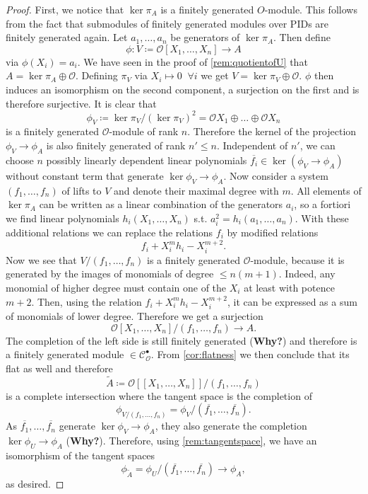 \documentclass{article}
\theoremstyle{plain}%
\theoremstyle{definition}
\theoremstyle{remark}
\newcommand{\cob}{\mathcal{C}_\mathcal{O}^\bullet}
\begin{document}
\begin{proof}
    First, we notice that \(\ker \pi_A\) is a finitely generated \(O\)-module.
    This follows from the fact that submodules of finitely generated modules over PIDs
    are finitely generated again.
    Let \(a_1, \dots, a_n\) be generators of \(\ker \pi_A\). Then define
    \[
        \phi\colon V \coloneqq \mathcal{O}[X_1, \dots, X_n] \to A  
    \]
    via \(\phi(X_i) = a_i\).
    We have seen in the proof of \cref{rem:quotientofU} that \(A = \ker \pi_A \oplus \mathcal{O}\).
    Defining \(\pi_V\) via \(X_i \mapsto 0\;\; \forall i\) we get \(V = \ker \pi_V \oplus \mathcal{O}\).
    \(\phi\) then induces an isomorphism on the second component, a surjection on the first
    and is therefore surjective.
    It is clear that
    \[
        \phi_V \coloneqq \ker \pi_V/(\ker \pi_V)^2 = \mathcal{O}X_1 \oplus \dots \oplus \mathcal{O}X_n
    \] 
    is a finitely generated \(\mathcal{O}\)-module of rank \(n\).
    Therefore the kernel of the projection \(\phi_V \to \phi_A\) is also finitely generated 
    of rank \(n' \leq n\).
    Independent of \(n'\), we can choose \(n\) possibly linearly dependent linear polynomials 
    \(\overline{f_i} \in \ker(\phi_V \to \phi_A)\) without constant term that generate 
    \(\ker \phi_V \to \phi_A\).
    Now consider a system \((f_1, \dots, f_n)\) of lifts to \(V\) and denote their maximal degree with \(m\).
    All elements of \(\ker \pi_A\) can be written as a linear combination of the generators \(a_i\), so a fortiori
    we find linear polynomials \(h_i(X_1, \dots, X_n)\) s.t. \(a_i^2 = h_i(a_1, \dots, a_n)\).
    With these additional relations we can replace the relations \(f_i\) by modified relations
    \[
        f_i + X_i^mh_i - X_i^{m+2}.  
    \]
    Now we see that \(V/(f_1, \dots, f_n)\) is a finitely generated \(\mathcal{O}\)-module, 
    because it is generated by the images of monomials of degree \(\leq n(m+1)\). Indeed, any monomial
    of higher degree must contain one of the \(X_i\) at least with potence \(m+2\). Then, using
    the relation \(f_i + X_i^mh_i - X_i^{m+2}\), it can be expressed as a sum of 
    monomials of lower degree.
    Therefore we get a surjection 
    \[
        \mathcal{O}[X_1, \dots, X_n]/(f_1, \dots, f_n) \to A.  
    \]
    The completion of the left side is still finitely generated (\textbf{Why?}) and therefore is
    a finitely generated module \(\in \cob\). From \cref{cor:flatness} we then
    conclude that its flat as well and therefore
    \[
        \tilde{A} \coloneqq \mathcal{O}[[X_1, \dots, X_n]]/(f_1, \dots, f_n)
    \]
    is a complete intersection where the tangent space is the completion of 
    \[
        \phi_{V/(f_1, \dots, f_n)} = \phi_V/(\overline{f_1}, \dots, \overline{f_n}).
    \]
    As \(\overline{f_1}, \dots, \overline{f_n}\) generate \(\ker \phi_V \to \phi_A\), they also generate 
    the completion \(\ker \phi_U \to \phi_A\) (\textbf{Why?}). Therefore, using \cref{rem:tangentspace}, 
    we have an isomorphism of the tangent spaces 
    \[
        \phi_{\tilde{A}} = \phi_U/(\overline{f_1}, \dots, \overline{f_n}) \to \phi_A,
    \]
    as desired.
\end{proof}
\end{document}
